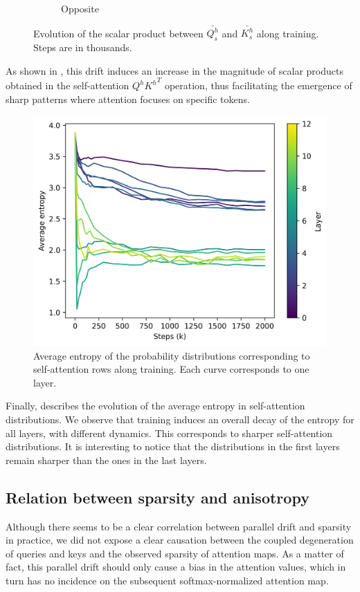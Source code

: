 \begin{figure}[ht]
\begin{subfigure}[b]{0.43\columnwidth}
         \caption{Opposite}
         \label{fig:scalar_opp}
    \end{subfigure}
    \caption{Evolution of the scalar product between $\bar{Q^h_s}$ and $\bar{K^h_s}$ along training. Steps are in thousands.}
    \label{fig:scalar_QK}
\end{figure}

As shown in , this drift induces an increase in the magnitude of scalar products obtained in the self-attention $Q^h{K^h}^T$ operation, thus facilitating the emergence of sharp patterns where attention focuses on specific tokens.

\begin{figure}[!ht]
    \centering
    \includegraphics[width=0.6\linewidth]{sources/part_1/anisotropy/imgs/entropy_decay.png}
    \caption{Average entropy of the probability distributions corresponding to self-attention rows along training. Each curve corresponds to one layer.}
    \label{fig:entropy_decay}
\end{figure}

Finally,  describes the evolution of the average entropy in self-attention distributions. We observe that training induces an overall decay of the entropy for all layers, with different dynamics. This corresponds to sharper self-attention distributions. It is interesting to notice that the distributions in the first layers remain sharper than the ones in the last layers.

\subsection{Relation between sparsity and anisotropy}

Although there seems to be a clear correlation between parallel drift and sparsity in practice, we did not expose a clear causation between the coupled degeneration of queries and keys and the observed sparsity of attention maps. As a matter of fact, this parallel drift should only cause a bias in the attention values, which in turn has no incidence on the subsequent softmax-normalized attention map.

